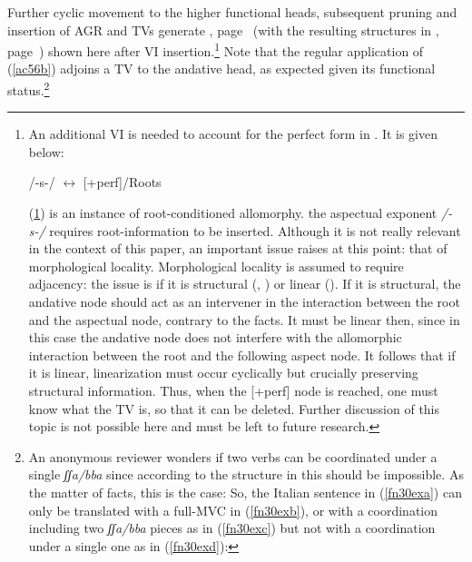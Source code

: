 \documentclass[output=paper]{langscibook}
\begin{document}
Further cyclic movement to the higher functional heads, subsequent pruning and insertion of AGR and TVs generate , page~\pageref{ac66} (with the resulting structures in , page~\pageref{ac67}) shown here after VI insertion.\footnote{An additional VI is needed to account for the perfect form in .  It is given below:

\ea \label{fn29ex} /-s-/ $\longleftrightarrow$ [+perf]/Roots \underline{\hspace{2em}}
\z

(\ref{fn29ex}) is an instance of root-conditioned allomorphy. the aspectual exponent \textit{/-s-/} requires root-information to be inserted. Although it is not really relevant in the context of this paper, an important issue raises at this point: that of morphological locality.  Morphological locality is assumed to require adjacency: the issue is if it is structural (\citealt{bobaljik2012a}, \citealt{calabrese2019a}) or linear (\citealt{embick2010a}).  If it is structural, the andative node should act as an intervener in the interaction between the root and the aspectual node, contrary to the facts. It must be linear then, since in this case the andative node does not interfere with the allomorphic interaction between the root and the following aspect node. It follows that if it is linear, linearization must occur cyclically but crucially preserving structural information. Thus, when the [+perf] node is reached, one must know what the TV is, so that it can be deleted. Further discussion of this topic is not possible here and must be left to future research.} Note that the regular application of (\ref{ac56b}) adjoins a TV to the andative head, as expected given its functional status.\footnote{An anonymous reviewer wonders if two verbs can be coordinated under a single \textit{ʃʃa/bba} since according to the structure in  this should be impossible. As the matter of facts, this is the case: So, the Italian sentence in (\ref{fn30exa}) can only be translated with a full-MVC in (\ref{fn30exb}), or with a coordination including two \textit{ʃʃa/bba} pieces as in (\ref{fn30exc}) but not with a coordination under a single one as in (\ref{fn30exd}):

}
\end{document}
